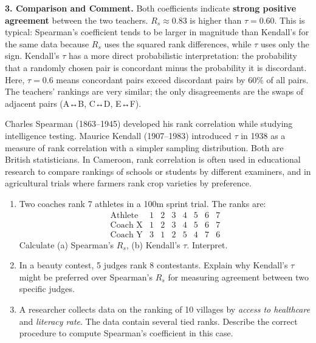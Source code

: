 \documentclass[11pt]{article}
\begin{document}
\begin{exoresolu}
\noindent\textbf{3. Comparison and Comment.}
Both coefficients indicate \textbf{strong positive agreement} between the two teachers. \(R_s \approx 0.83\) is higher than \(\tau = 0.60\). This is typical: Spearman's coefficient tends to be larger in magnitude than Kendall's for the same data because \(R_s\) uses the squared rank differences, while \(\tau\) uses only the sign. Kendall's \(\tau\) has a more direct probabilistic interpretation: the probability that a randomly chosen pair is concordant minus the probability it is discordant. Here, \(\tau = 0.6\) means concordant pairs exceed discordant pairs by 60\% of all pairs. The teachers' rankings are very similar; the only disagreements are the swaps of adjacent pairs (A↔B, C↔D, E↔F).
\end{exoresolu}

\begin{savaistu}
Charles Spearman (1863–1945) developed his rank correlation while studying intelligence testing. Maurice Kendall (1907–1983) introduced \(\tau\) in 1938 as a measure of rank correlation with a simpler sampling distribution. Both are British statisticians. In Cameroon, rank correlation is often used in educational research to compare rankings of schools or students by different examiners, and in agricultural trials where farmers rank crop varieties by preference.
\end{savaistu}

\begin{exercice}
\begin{enumerate}
\item Two coaches rank 7 athletes in a 100m sprint trial. The ranks are:
\[
\begin{array}{c|ccccccc}
\text{Athlete} & 1 & 2 & 3 & 4 & 5 & 6 & 7 \\ \hline
\text{Coach X} & 1 & 2 & 3 & 4 & 5 & 6 & 7 \\
\text{Coach Y} & 3 & 1 & 2 & 5 & 4 & 7 & 6
\end{array}
\]
Calculate (a) Spearman's \(R_s\), (b) Kendall's \(\tau\). Interpret.
\item In a beauty contest, 5 judges rank 8 contestants. Explain why Kendall's \(\tau\) might be preferred over Spearman's \(R_s\) for measuring agreement between two specific judges.
\item A researcher collects data on the ranking of 10 villages by \emph{access to healthcare} and \emph{literacy rate}. The data contain several tied ranks. Describe the correct procedure to compute Spearman's coefficient in this case.
\end{enumerate}
\end{exercice}
\end{document}
